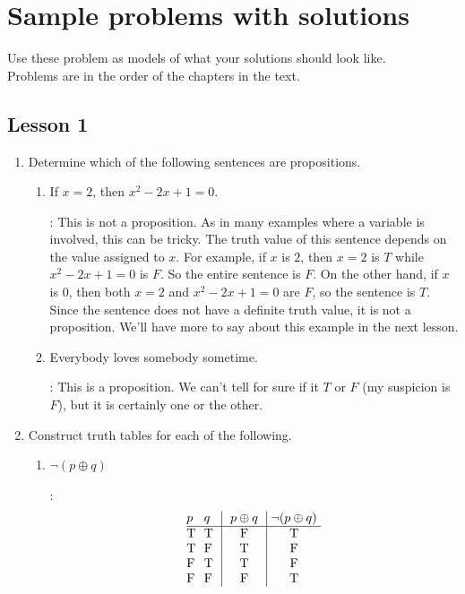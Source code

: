 \documentclass[11pt]{amsart}
\begin{document}
\section{Sample problems with solutions}
\begin{center}
Use these problem as models of what your solutions should look like.\\
Problems are in the order of the chapters in the text.
\end{center}
\vskip 10pt

\subsection{Lesson 1}
\begin{enumerate}

\item  Determine which of the following sentences are propositions. 

\begin{enumerate}

\item If $x=2$, then $x^2-2x+1=0$.

: This is not a proposition. As in many examples where a variable is involved,
this can be tricky. The truth value of this sentence depends on the value assigned to $x$. For example,
if $x$ is $2$, then $x=2$ is $T$ while $x^2-2x+1=0$ is $F$. So the entire sentence is $F$. On the
other hand, if $x$ is $0$, then both $x=2$ and $x^2-2x+1=0$ are $F$, so the sentence is $T$.
Since the sentence does not have a definite truth value, it is not a proposition. We'll have more
to say about this example in the next lesson.

\item Everybody loves somebody sometime.

: This is a proposition. We can't tell for sure if it $T$ or $F$ (my suspicion is $F$), but it is 
certainly one or the other.

\end{enumerate}

\item Construct truth tables for each of the following.

\begin{enumerate}
 \item $\neg(p\oplus q)$

:
$$\vbox{\offinterlineskip
\halign { \strut # & # & \vrule ~~# & \vrule ~#\cr
$p$ & $q$ & $p\oplus q$ & $\neg(p\oplus q)$ \cr
\noalign{\hrule}
T   &  T   &  F  &  T \cr
T   &  F   &  T  &  F \cr
F   &  T   &  T  &  F \cr
F   &  F   &  F  &  T \cr
}}$$



\end{enumerate}
\end{enumerate}
\end{document}
